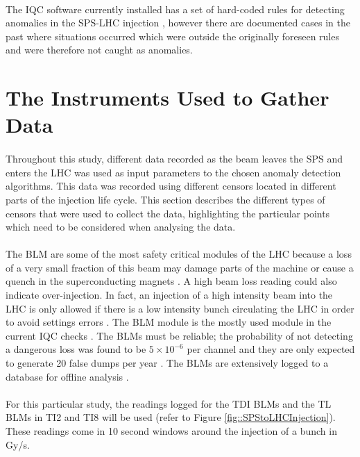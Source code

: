\paragraph{ }The \ac{IQC} software currently installed has a set of hard-coded rules for detecting anomalies in the \acs{SPS}-\acs{LHC} injection \cite{Drosdal2011}, however there are documented cases in the past where situations occurred which were outside the originally foreseen rules and were therefore not caught as anomalies.

\section{The Instruments Used to Gather Data}
\paragraph{ }Throughout this study, different data recorded as the beam leaves the \acs{SPS} and enters the \acs{LHC} was used as input parameters to the chosen anomaly detection algorithms. This data was recorded using different censors located in different parts of the injection life cycle. This section describes the different types of censors that were used to collect the data, highlighting the particular points which need to be considered when analysing the data.

\paragraph{ }The \ac{BLM} are some of the most safety critical modules of the \acs{LHC} because a loss of a very small fraction of this beam may damage parts of the machine or cause a quench in the superconducting magnets \cite{Holzer2006}. A high beam loss reading could also indicate over-injection. In fact, an injection of a high intensity beam into the LHC is only allowed if there is a low intensity bunch circulating the LHC in order to avoid settings errors \cite{Kain2010}. The \acs{BLM} module is the mostly used module in the current IQC checks \cite{Drosdal2011}. The \acs{BLM}s must be reliable; the probability of not detecting a dangerous loss was found to be $5\times10^{-6}$ per channel and they are only expected to generate 20 false dumps per year \cite{Holzer2006}. The \acs{BLM}s are extensively logged to a database for offline analysis \cite{Holzer2006}. 

\paragraph{ }For this particular study, the readings logged for the \ac{TDI} \acs{BLM}s and the \ac{TL} \acs{BLM}s in TI2 and TI8 will be used (refer to Figure \ref{fig::SPStoLHCInjection}). These readings come in 10 second windows around the injection of a bunch in \ac{Gy/s}.

